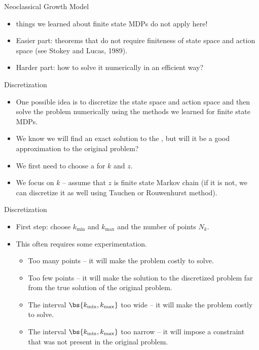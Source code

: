 \documentclass[11pt,xcolor={dvipsnames},aspectratio=159,hyperref={pdftex,pdfpagemode=UseNone,hidelinks,pdfdisplaydoctitle=true},usepdftitle=false]{beamer}
\begin{document}
    \begin{frame}{Neoclassical Growth Model}
        \begin{itemize}
            \item {} things we learned about finite state MDPs do not apply here!
            \item Easier part: theorems that do not require finiteness of state space and action space (see Stokey and Lucas, 1989).
            \item Harder part: how to solve it numerically in an efficient way?
        \end{itemize}
        \end{frame}

    \begin{frame}
        \end{frame}


\begin{frame}{Discretization}   
    \begin{itemize}
        \item One possible idea is to discretize the state space and action space and then solve the problem numerically using the methods we learned for finite state MDPs.
        \item We know we will find an exact solution to the , but will it be a good approximation to the original problem?
        \item We first need to choose a  for $k$ and $z$.
        \item We focus on $k$ -- assume that $z$ is finite state Markov chain (if it is not, we can discretize it as well using Tauchen or Rouwenhurst method).
    \end{itemize}
    \end{frame}


\begin{frame}{Discretization}   
    \begin{itemize}
        \item First step: choose $k_{\min}$ and $k_{\max}$ and the number of points $N_k$. 
        \item This often requires some experimentation. \begin{itemize}
            \item Too many points -- it will make the problem costly to solve. 
            \item Too few points -- it will make the solution to the discretized problem far from the true solution of the original problem.
            \item The interval $\bs{k_{\min}, k_{\max}}$ too wide -- it will make the problem costly to solve.
            \item The interval $\bs{k_{\min}, k_{\max}}$ too narrow -- it will impose a constraint that was not present in the original problem.
        \end{itemize}
    \end{itemize}
    \end{frame}
\end{document}
